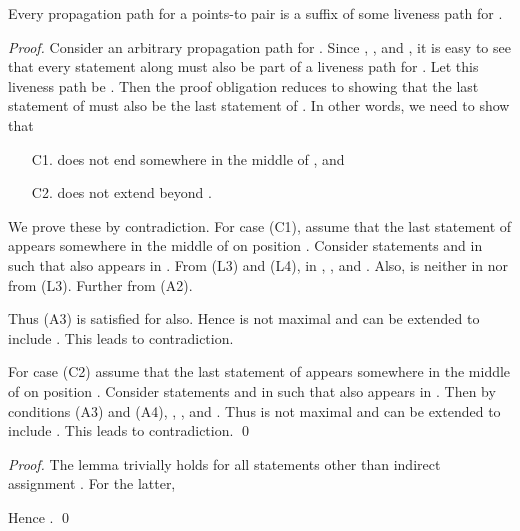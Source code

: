 \documentclass{llncs}
\newcommand{\pt}[2]{\text{}}
\begin{document}
\begin{theorem}
Every propagation path for a points-to pair \pt{x}{y} is a suffix of some 
liveness path for .
\end{theorem}
\begin{proof}
Consider an arbitrary propagation path  for \pt{x}{y}. Since
\text{}, \text{}, and \text{},
it is easy to see that every statement  along  must also be
part of a liveness path for . Let this liveness path be .
Then the proof obligation reduces to showing that the last statement of
 must also be the last statement of . In other words, we
need to show that
\begin{enumerate}
\item[C1.]  does not end somewhere in the middle of , and 
\item[C2.]  does not extend beyond .
\end{enumerate}
We prove these by contradiction. For case (C1), assume that the last
statement of  appears somewhere in the middle of  on
position . Consider statements  and  in 
such that  also appears in . From (L3) and (L4), in
\text{}, \text{}, and \text{}. Also,  is neither in  nor
 from (L3). Further \text{}
from (A2).
 
Thus (A3) is satisfied for  also. Hence  is not        
maximal and can be extended to include . This leads to         
contradiction.                                                          

For case (C2) assume that the last statement of  appears
somewhere in the middle of  on position . Consider
statements  and  in  such that  also
appears in . Then by conditions (A3) and (A4), \text{}, \text{}, and \text{}. Thus  is not maximal and can be extended to
include . This leads to contradiction. \qed
\end{proof}


\begin{lemma}
\label{lemma.kill.def}

\end{lemma}
\begin{proof}
The lemma trivially holds for all statements other than indirect
assignment \text{}. For the latter,

Hence \text{}.
\qed
\end{proof}
\end{document}

